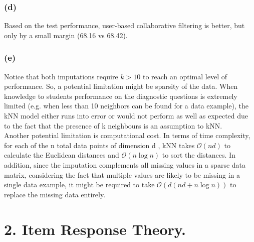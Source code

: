 \documentclass{article}
\begin{document}
\begin{spacing}{1.5} 
\subsubsection*{(d)}
Based on the test performance, user-based collaborative filtering is better, but only by a small margin (68.16 vs 68.42). 
\subsubsection*{(e)}
Notice that both imputations require $k>10$ to reach an optimal level of performance. So, a potential limitation might be sparsity of the data. When knowledge to students performance on the diagnostic
 questions is extremely limited (e.g. when less than 10 neighbors can be found for a data example), the kNN model either runs into error or would not perform as well as expected due to the fact that the
presence of k neighbours is an assumption to kNN.\\ 
Another potential limitation is computational cost. In terms of time complexity, for each of the n total data points of dimension d , kNN takes $\mathcal{O}(nd)$ to calculate the Euclidean distances 
and $\mathcal{O}(n \log n)$ to sort the distances. In addition, since the imputation complements all missing values in a sparse data matrix, considering the fact that multiple values are likely to be missing in a single data example, it might be
 required to take $\mathcal{O}(d (nd + n \log n))$ to replace the missing data entirely. 
\section*{2. Item Response Theory.}

\end{spacing}
\end{document}
